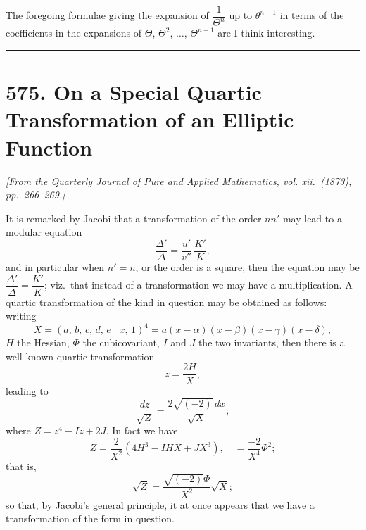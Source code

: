 \documentclass[11pt]{article}
\begin{document}
The foregoing formulae giving the expansion of $\dfrac{1}{\Theta^{n}}$ up to $\theta^{n-1}$ in terms of the coefficients in the expansions of $\Theta$, $\Theta^{2}$, $\ldots$, $\Theta^{n-1}$ are I think interesting.

\bigskip
\hrule
\bigskip

\section*{575. On a Special Quartic Transformation of an Elliptic Function}

\noindent\textit{[From the Quarterly Journal of Pure and Applied Mathematics, vol. xii.\ (1873), pp.\ 266--269.]}

\medskip

It is remarked by Jacobi that a transformation of the order $nn'$ may lead to a modular equation
\[
\frac{\Delta'}{\Delta} = \frac{u'}{v''}\,\frac{K'}{K},
\]
and in particular when $n'=n$, or the order is a square, then the equation may be $\dfrac{\Delta'}{\Delta} = \dfrac{K'}{K}$; viz.\ that instead of a transformation we may have a multiplication. A quartic transformation of the kind in question may be obtained as follows: writing
\[
X = (a,\,b,\,c,\,d,\,e\mid x,\,1)^{4} = a(x-\alpha)(x-\beta)(x-\gamma)(x-\delta),
\]
$H$ the Hessian, $\Phi$ the cubicovariant, $I$ and $J$ the two invariants, then there is a well-known quartic transformation
\[
z = \frac{2H}{X},
\]
leading to
\[
\frac{dz}{\sqrt{Z}} = \frac{2\sqrt{(-2)}\,dx}{\sqrt{X}},
\]
where $Z = z^{4} - Iz + 2J$. In fact we have
\[
Z = \frac{2}{X^{2}}(4H^{3} - IHX + JX^{3}),\quad = \frac{-2}{X^{4}}\Phi^{2};
\]
that is,
\[
\sqrt{Z} = \frac{\sqrt{(-2)}\Phi}{X^{2}}\sqrt{X};
\]
so that, by Jacobi's general principle, it at once appears that we have a transformation of the form in question.
\end{document}
